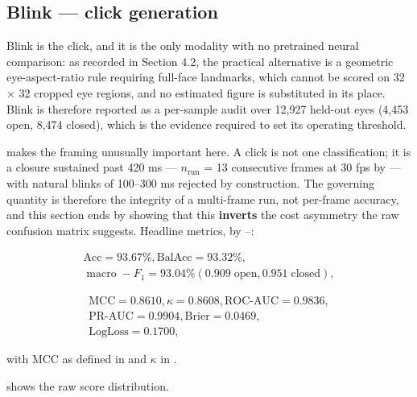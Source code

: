 \FloatBarrier

\subsection{Blink --- click generation}

Blink is the click, and it is the only modality with no pretrained neural comparison: as recorded in Section 4.2, the practical alternative is a geometric eye-aspect-ratio rule requiring full-face landmarks, which cannot be scored on 32 $\times$ 32 cropped eye regions, and no estimated figure is substituted in its place. Blink is therefore reported as a per-sample audit over 12,927 held-out eyes (4,453 open, 8,474 closed), which is the evidence required to set its operating threshold.

 makes the framing unusually important here. A click is not one classification; it is a closure sustained past 420 ms --- $n_{\mathrm{run}}$ = 13 consecutive frames at 30 fps by  --- with natural blinks of 100--300 ms rejected by construction. The governing quantity is therefore the integrity of a multi-frame run, not per-frame accuracy, and this section ends by showing that this \textbf{inverts} the cost asymmetry the raw confusion matrix suggests. Headline metrics, by --:

\begin{equation}
\label{eq:268}
\begin{aligned}
\mathrm{Acc} = 93.67 \% , \mathrm{BalAcc} = 93.32 \% , \\
\;\text{macro}\;-F_{1} = 93.04 \% ( 0.909 \;\text{open}, 0.951 \;\text{closed} ) ,
\end{aligned}
\end{equation}

\begin{equation}
\label{eq:269}
\begin{aligned}
\mathrm{MCC} = 0.8610 , \kappa = 0.8608 , \mathrm{ROC\text{-}AUC} = 0.9836 , \\
\mathrm{PR\text{-}AUC} = 0.9904 , \mathrm{Brier} = 0.0469 , \\
\mathrm{LogLoss} = 0.1700 ,
\end{aligned}
\end{equation}

with MCC as defined in   and $\kappa$ in  .

 shows the raw score distribution.

